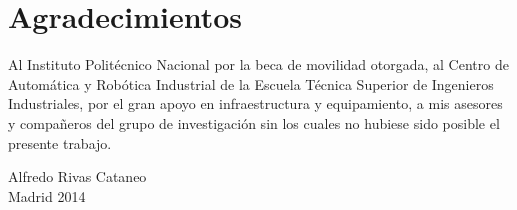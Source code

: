 \newpage
\thispagestyle{plain}
\mbox{}

\newpage
\thispagestyle{empty}
\chapter*{Agradecimientos}
\begin{flushright}
\begin{minipage}{0,6\textwidth}
Al Instituto Politécnico Nacional por la beca de movilidad otorgada, al Centro de Automática y Robótica Industrial de la Escuela Técnica Superior de Ingenieros Industriales, por el gran apoyo en infraestructura y equipamiento, a mis asesores y compañeros del grupo de investigación sin los cuales no hubiese sido posible el presente trabajo.



\end{minipage}

\end{flushright}
\vspace{10cm}
\begin{flushright}
Alfredo Rivas Cataneo\\
Madrid 2014
\end{flushright}






